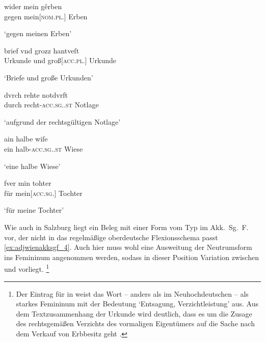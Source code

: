 \begin{exe}
\ex \label{ex:adjwienapo}
	\begin{xlist}
	\ex \label{ex:adjwienregel_1}
		\gll wider mein gêrben \\
			gegen mein[\textsc{nom.pl.\MascM}] Erben \\
		\begin{taggedline}{\parencites(Wien, 1284)[\pno~N~263, 210.24]{cao5}}
		\trans `gegen meinen Erben'
		\end{taggedline}

	\ex \label{ex:adjwienregel_2}
		\gll brief vnd grozz hantveſt \\
			Urkunde und groß[\textsc{acc.pl.\FemI}] Urkunde \\
		\begin{taggedline}{\parencites(Stift~Heiligenkreuz, Bz.~Baden, 1263)[\pno~67, 103.21]{cao1}}
		\trans `Briefe und große Urkunden'
		\end{taggedline}
	\end{xlist}

\ex \label{ex:adjwienakksgf}
	\begin{xlist}
	\ex \label{ex:adjwienakksgf_1}
		\gll dvrch rehte notdvrft \\
			durch recht-\textsc{acc.sg.\FemI.st} Notlage \\
		\begin{taggedline}{\parencites(Wien, 1298)[\pno~2966, 243.3]{cao4}}
		\trans `aufgrund der rechtsgültigen Notlage'
		\end{taggedline}

	\ex \label{ex:adjwienakksgf_2}
		\gll ain halbe wiſe \\
			ein halb-\textsc{acc.sg.\FemI.st} Wiese \\
		\begin{taggedline}{\parencites(Wien, 1295)[\pno~N~718, 518.5]{cao5}}
		\trans `eine halbe Wiese'
		\end{taggedline}
	
	\ex \label{ex:adjwienakksgf_3}
		\gll fver min tohter \\
			für mein[\textsc{acc.sg.\FemF}] Tochter \\
		\begin{taggedline}{\parencites(Wien, 1292)[\pno~1578, 724.6]{cao2}}
		\trans `für meine Tochter'
		\end{taggedline}
	\end{xlist}
\end{exe}

Wie auch in Salzburg liegt ein Beleg mit einer Form vom Typ  im Akk.\
Sg.\ F. vor, der nicht in das regelmäßige oberdeutsche Flexionsschema passt
\cref{ex:adjwienakksgf_4}. Auch hier muss wohl eine Ausweitung der Neutrumsform
ins Femininum angenommen werden, sodass in dieser Position Variation zwischen
\norm{-e} und \norm{-iu} vorliegt.%
%
	\footnote{Der Eintrag für  in \citet{lexer:mhdhwb} weist das
		Wort -- anders als im Neuhochdeutschen -- als starkes Femininum mit der
		Bedeutung `Entsagung, Verzichtleistung' aus. Aus dem
		Textzusammenhang der Urkunde wird deutlich, dass es um die Zusage des
		rechtsgemäßen Verzichts des vormaligen Eigentümers auf die Sache nach
		dem Verkauf von Erbbesitz geht \autocite[vgl. auch][506]{caor}.}

